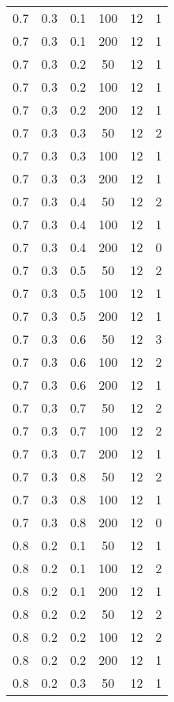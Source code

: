 \begin{center}
\begin{longtable}[c]{|c|c|c|c|c|c|}
	0.7 &  0.3 &  0.1 &  100 &    12 &     1 \\
	0.7 &  0.3 &  0.1 &  200 &    12 &     1 \\
   \hline
	0.7 &  0.3 &  0.2 &   50 &    12 &     1 \\
	0.7 &  0.3 &  0.2 &  100 &    12 &     1 \\
	0.7 &  0.3 &  0.2 &  200 &    12 &     1 \\
   \hline
	0.7 &  0.3 &  0.3 &   50 &    12 &     2 \\
	0.7 &  0.3 &  0.3 &  100 &    12 &     1 \\
	0.7 &  0.3 &  0.3 &  200 &    12 &     1 \\
   \hline
	0.7 &  0.3 &  0.4 &   50 &    12 &     2 \\
	0.7 &  0.3 &  0.4 &  100 &    12 &     1 \\
	0.7 &  0.3 &  0.4 &  200 &    12 &     0 \\
   \hline
	0.7 &  0.3 &  0.5 &   50 &    12 &     2 \\
	0.7 &  0.3 &  0.5 &  100 &    12 &     1 \\
	0.7 &  0.3 &  0.5 &  200 &    12 &     1 \\
   \hline
	0.7 &  0.3 &  0.6 &   50 &    12 &     3 \\
	0.7 &  0.3 &  0.6 &  100 &    12 &     2 \\
	0.7 &  0.3 &  0.6 &  200 &    12 &     1 \\
   \hline
	0.7 &  0.3 &  0.7 &   50 &    12 &     2 \\
	0.7 &  0.3 &  0.7 &  100 &    12 &     2 \\
	0.7 &  0.3 &  0.7 &  200 &    12 &     1 \\
   \hline
	0.7 &  0.3 &  0.8 &   50 &    12 &     2 \\
	0.7 &  0.3 &  0.8 &  100 &    12 &     1 \\
	0.7 &  0.3 &  0.8 &  200 &    12 &     0 \\
   \hline
	0.8 &  0.2 &  0.1 &   50 &    12 &     1 \\
	0.8 &  0.2 &  0.1 &  100 &    12 &     2 \\
	0.8 &  0.2 &  0.1 &  200 &    12 &     1 \\
   \hline
	0.8 &  0.2 &  0.2 &   50 &    12 &     2 \\
	0.8 &  0.2 &  0.2 &  100 &    12 &     2 \\
	0.8 &  0.2 &  0.2 &  200 &    12 &     1 \\
   \hline
	0.8 &  0.2 &  0.3 &   50 &    12 &     1 \\

\end{longtable}
\end{center}
